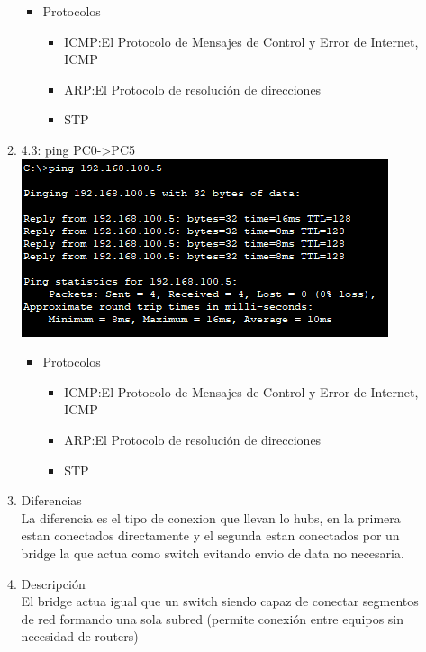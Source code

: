 \documentclass[11pt]{article}
\begin{document}
\begin{enumerate}
\begin{enumerate}
        \begin{itemize}
            \item Protocolos
            \begin{itemize}
                \item ICMP:El Protocolo de Mensajes de Control y Error de Internet, ICMP
                \item ARP:El Protocolo de resolución de direcciones
                \item STP
            \end{itemize}
        \end{itemize}
        
        \item 4.3: ping PC0->PC5\\
        \includegraphics[scale=0.5]{Act/6_2.PNG}
        \begin{itemize}
            \item Protocolos
            \begin{itemize}
                \item ICMP:El Protocolo de Mensajes de Control y Error de Internet, ICMP
                \item ARP:El Protocolo de resolución de direcciones
                \item STP
            \end{itemize}
        \end{itemize}
        \item Diferencias\\
        La diferencia es el tipo de conexion que llevan lo hubs, en la primera estan conectados directamente y el segunda estan conectados por un bridge la que actua como switch evitando envio de data no necesaria.
        \item Descripción\\
        El bridge actua igual que un switch siendo capaz de conectar segmentos de red formando una sola subred (permite conexión entre equipos sin necesidad de routers)

\end{enumerate}
\end{enumerate}
\end{document}
